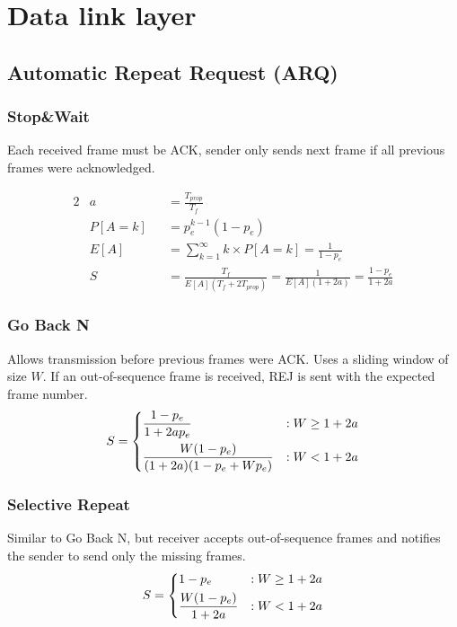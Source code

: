 \documentclass{form}
\begin{document}
\noindent%
\begin{minipage}[c]{0.49\textwidth}
    \section*{Data link layer}
    \subsection*{Automatic Repeat Request (ARQ)}
    \subsubsection*{Stop\&Wait}
    Each received frame must be ACK, sender only sends next frame if all previous frames were acknowledged.

    \begin{center}
        \begin{alignat*}{2}
            & a      &&= \frac{T_{prop}}{T_f} \\
            & P[A=k] &&= p_e^{k-1} (1-p_e)\\
            & E[A]   &&= \sum_{k=1}^{\infty}{k \times P[A=k]} = \frac{1}{1-p_e}\\
            & S      &&= \frac{T_f}{E[A](T_f+2T_{prop})} = \frac{1}{E[A](1+2a)} = \frac{1-p_e}{1+2a}
        \end{alignat*}
    \end{center}
\end{minipage}
\begin{minipage}[c]{0.49\textwidth}
    \subsubsection*{Go Back N}
    Allows transmission before previous frames were ACK. Uses a sliding window of size $W$.
    If an out-of-sequence frame is received, REJ is sent with the expected frame number.
    \begin{equation*}
        S = \begin{dcases}
            \frac{1-p_e}{1+2ap_e}               & : W \geq 1+2a \\
            \frac{W(1-p_e)}{(1+2a)(1-p_e+Wp_e)} & : W < 1+2a
        \end{dcases}
    \end{equation*}

    \subsubsection*{Selective Repeat}
    Similar to Go Back N, but receiver accepts out-of-sequence frames and notifies the sender to send only the missing frames.
    \begin{equation*}
        S = \begin{dcases}
            1-p_e                 & : W \geq 1+2a \\
            \frac{W(1-p_e)}{1+2a} & : W < 1+2a
        \end{dcases}
    \end{equation*}
\end{minipage}
\end{document}
